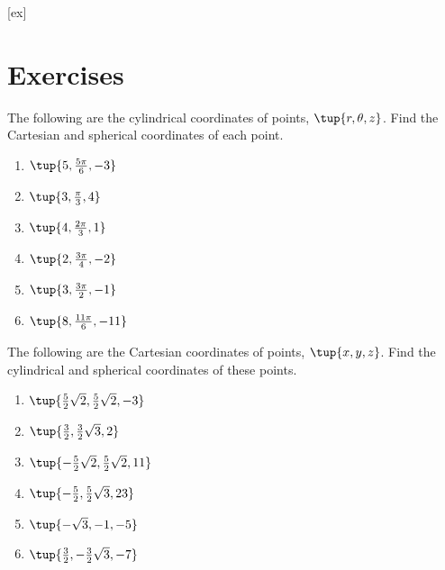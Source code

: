 [ex]
\section*{Exercises}

\begin{enumialphparenastyle}

\begin{ex} The following are the cylindrical coordinates of points, $\tup{
r,\theta,z} $. Find the Cartesian and spherical coordinates of each point.

\begin{enumerate}
\item $\tup{5,\frac{5\pi }{6},-3} $

\item $\tup{3,\frac{\pi }{3},4} $

\item $\tup{4,\frac{2\pi }{3},1} $

\item $\tup{2,\frac{3\pi }{4},-2} $

\item $\tup{3,\frac{3\pi }{2},-1} $

\item $\tup{8,\frac{11\pi }{6},-11} $
\end{enumerate}
\end{ex}

\begin{ex} The following are the Cartesian coordinates of points, $\tup{
x,y,z} $. Find the cylindrical and spherical coordinates of these
points.

\begin{enumerate}
\item $\tup{\frac{5}{2}\sqrt{2},\frac{5}{2}\sqrt{2},-3} $

\item $\tup{\frac{3}{2},\frac{3}{2}\sqrt{3},2} $

\item $\tup{-\frac{5}{2}\sqrt{2},\frac{5}{2}\sqrt{2},11} $

\item $\tup{-\frac{5}{2},\frac{5}{2}\sqrt{3},23} $

\item $\tup{-\sqrt{3},-1,-5} $

\item $\tup{\frac{3}{2},-\frac{3}{2}\sqrt{3},-7} $


\end{enumerate}
\end{ex}
\end{enumialphparenastyle}
